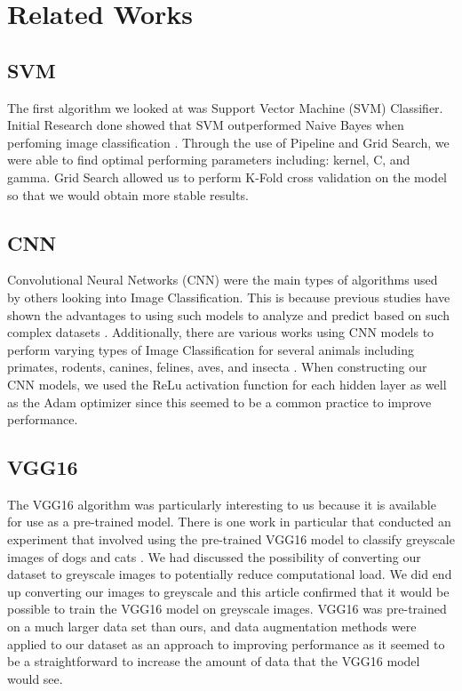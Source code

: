 \graphicspath{ {project_images/} }
\section{Related Works}

\subsection{SVM}
The first algorithm we looked at was Support Vector Machine (SVM) Classifier. 
Initial Research done showed that SVM outperformed Naive Bayes when perfoming image classification \cite{SVM}.
Through the use of Pipeline and Grid Search, we were able to find optimal performing parameters including: kernel, C, and gamma.
Grid Search allowed us to perform K-Fold cross validation on the model so that we would obtain more stable results.

\subsection{CNN}
Convolutional Neural Networks (CNN) were the main types of algorithms used by others looking into Image Classification.
This is because previous studies have shown the advantages to using such models to analyze and predict based on such complex datasets \cite{CNNPerformance}.
Additionally, there are various works using CNN models to perform varying types of Image Classification for several animals including primates, rodents, canines, felines, aves, and insecta \cite{AnimalSpecies1, AnimalSpecies2, AnimalBreed, Mosquito}.
When constructing our CNN models, we used the ReLu activation function for each hidden layer as well as the Adam optimizer since this seemed to be a common practice to improve performance.

\subsection{VGG16}
The VGG16 algorithm was particularly interesting to us because it is available for use as a pre-trained model.
There is one work in particular that conducted an experiment that involved using the pre-trained VGG16 model to classify greyscale images of dogs and cats \cite{VGG16Greyscale}. We had discussed the possibility of converting our dataset to greyscale images to potentially reduce computational load. We did end up converting our images to greyscale and this article confirmed that it would be possible to train the VGG16 model on greyscale images. 
VGG16 was pre-trained on a much larger data set than ours, and data augmentation methods were applied to our dataset as an approach to improving performance as it seemed to be a straightforward to increase the amount of data that the VGG16 model would see.

